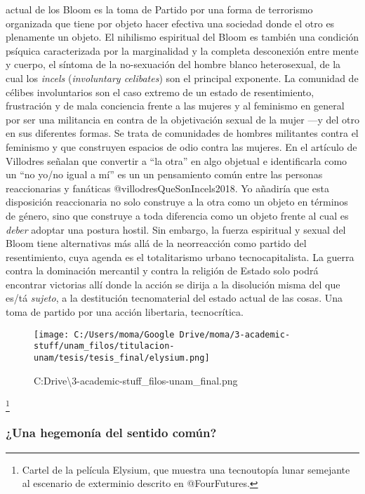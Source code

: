 \documentclass[
]{article}
\begin{document}
actual de los Bloom es la toma de Partido por una forma de terrorismo
organizada que tiene por objeto hacer efectiva una sociedad donde el
otro es plenamente un objeto. El nihilismo espiritual del Bloom es
también una condición psíquica caracterizada por la marginalidad y la
completa desconexión entre mente y cuerpo, el síntoma de la no-sexuación
del hombre blanco heterosexual, de la cual los \emph{incels}
(\emph{involuntary celibates}) son el principal exponente. La comunidad
de célibes involuntarios son el caso extremo de un estado de
resentimiento, frustración y de mala conciencia frente a las mujeres y
al feminismo en general por ser una militancia en contra de la
objetivación sexual de la mujer ---y del otro en sus diferentes formas.
Se trata de comunidades de hombres militantes contra el feminismo y que
construyen espacios de odio contra las mujeres. En el artículo de
Villodres señalan que convertir a ``la otra'' en algo objetual e
identificarla como un ``no yo/no igual a mí'' es un un pensamiento común
entre las personas reaccionarias y fanáticas @villodresQueSonIncels2018.
Yo añadiría que esta disposición reaccionaria no solo construye a la
otra como un objeto en términos de género, sino que construye a toda
diferencia como un objeto frente al cual es \emph{deber} adoptar una
postura hostil. Sin embargo, la fuerza espiritual y sexual del Bloom
tiene alternativas más allá de la neorreacción como partido del
resentimiento, cuya agenda es el totalitarismo urbano tecnocapitalista.
La guerra contra la dominación mercantil y contra la religión de Estado
solo podrá encontrar victorias allí donde la acción se dirija a la
disolución misma del que es/tá \emph{sujeto}, a la destitución
tecnomaterial del estado actual de las cosas. Una toma de partido por
una acción libertaria, tecnocrítica.

\begin{figure}
\centering
\texttt{[image: C:/Users/moma/Google Drive/moma/3-academic-stuff/unam\_filos/titulacion-unam/tesis/tesis\_final/elysium.png]}
\caption{C:\Users\moma\Google Drive\moma\textbackslash3-academic-stuff\unam\_filos\titulacion-unam\tesis\tesis\_final\elysium.png}
\end{figure}

\footnote{Cartel de la película Elysium, que muestra una tecnoutopía
  lunar semejante al escenario de exterminio descrito en @FourFutures.}

\hypertarget{una-hegemonuxeda-del-sentido-comuxfan}{%
\subsubsection{¿Una hegemonía del sentido
común?}\label{una-hegemonuxeda-del-sentido-comuxfan}}
\end{document}
